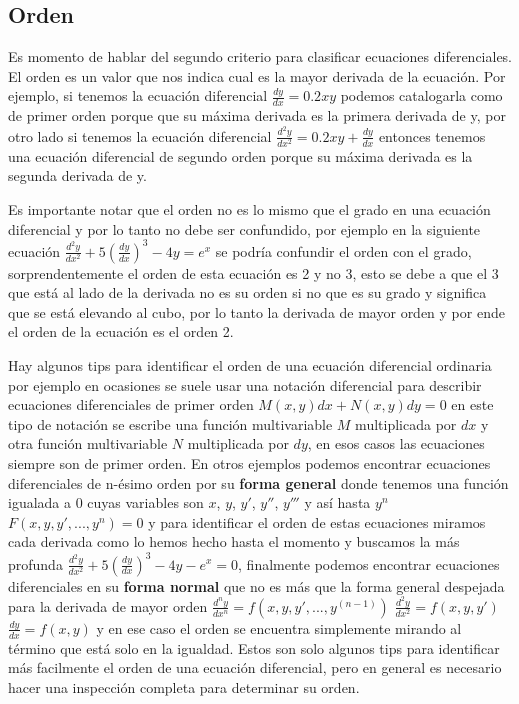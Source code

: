 \documentclass[12pt, letterpaper]{article}
\begin{document}
        \subsection{Orden}
            \noindent
                Es momento de hablar del segundo criterio para clasificar ecuaciones diferenciales. El orden es un valor que nos indica cual es la mayor derivada de la ecuación. Por ejemplo, si tenemos la ecuación diferencial $\frac{dy}{dx} = 0.2xy$ podemos catalogarla como de primer orden porque que su máxima derivada es la primera derivada de y, por otro lado si tenemos la ecuación diferencial $\frac{d^2y}{dx^2} =  0.2xy+\frac{dy}{dx}$ entonces tenemos una ecuación diferencial de segundo orden porque su máxima derivada es la segunda derivada de y.
            \par
                Es importante notar que el orden no es lo mismo que el grado en una ecuación diferencial y por lo tanto no debe ser confundido, por ejemplo en la siguiente ecuación $\frac{d^2y}{dx^2}+5\left(\frac{dy}{dx}\right)^3-4y=e^x$ se podría confundir el orden con el grado, sorprendentemente el orden de esta ecuación es 2 y no 3, esto se debe a que el 3 que está al lado de la derivada no es su orden si no que es su grado y significa que se está elevando al cubo, por lo tanto la derivada de mayor orden y por ende el orden de la ecuación es el orden 2.
            \par
                Hay algunos tips para identificar el orden de una ecuación diferencial ordinaria por ejemplo en ocasiones se suele usar una notación diferencial para describir ecuaciones diferenciales de primer orden $M(x, y)dx+N(x, y)dy=0$ en este tipo de notación se escribe una función multivariable $M$ multiplicada por $dx$ y otra función multivariable $N$ multiplicada por $dy$, en esos casos las ecuaciones siempre son de primer orden.
                En otros ejemplos podemos encontrar ecuaciones diferenciales de n-ésimo orden por su \textbf{forma general} donde tenemos una función igualada a 0 cuyas variables son $x$, $y$, $y'$, $y''$, $y'''$ y así hasta $y^n$ $F(x, y, y', ..., y^n) = 0$ y para identificar el orden de estas ecuaciones miramos cada derivada como lo hemos hecho hasta el momento y buscamos la más profunda $\frac{d^2y}{dx^2}+5\left(\frac{dy}{dx}\right)^3-4y-e^x=0$, finalmente podemos encontrar ecuaciones diferenciales en su \textbf{forma normal} que no es más que la forma general despejada para la derivada de mayor orden $\frac{d^ny}{dx^n}=f(x,y,y',...,y^{(n-1)})$ $\frac{d^2y}{dx^2}=f(x,y,y')$ $\frac{dy}{dx}=f(x,y)$ y en ese caso el orden se encuentra simplemente mirando al término que está solo en la igualdad.
                Estos son solo algunos tips para identificar más facilmente el orden de una ecuación diferencial, pero en general es necesario hacer una inspección completa para determinar su orden.
\end{document}
